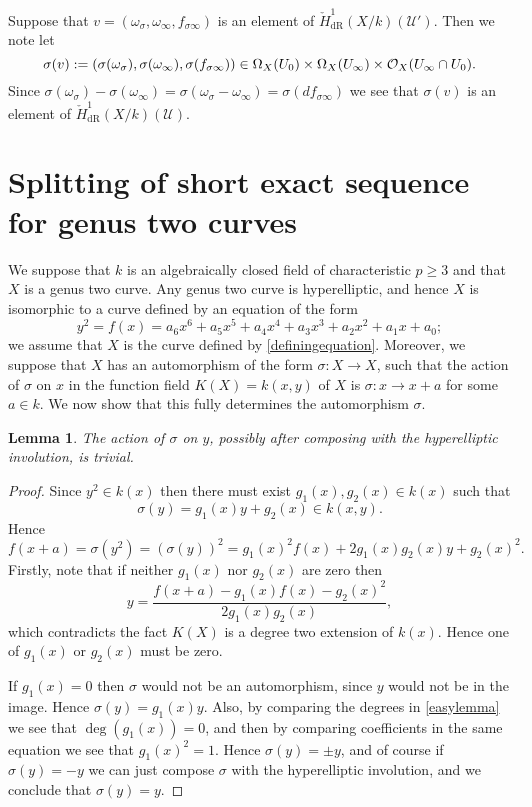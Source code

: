 \documentclass[draft, 11pt]{article} %
\theoremstyle{plain}
\newtheorem{lem}[defn]{Lemma}
\theoremstyle{remark}
\newcommand{\cO}{{\cal O}}
\newcommand{\ra}{\rightarrow}
\newcommand{\cU}{{\mathcal U}}
\newcommand{\cechderhamhone}{\check{H}_{\text {dR}}^1(X/k)}
\begin{document}
Suppose that $v = (\omega_\sigma , \omega_\infty, f_{\sigma \infty})$ is an element of $\cechderhamhone(\cU')$.
Then we note let
\begin{equation*}
\sigma(v) := (\sigma(\omega_\sigma), \sigma(\omega_\infty), \sigma(f_{\sigma \infty})) \in \Omega_X(U_0) \times \Omega_X(U_\infty) \times \cO_X(U_\infty \cap U_0).
\end{equation*}
Since $\sigma(\omega_\sigma)-\sigma(\omega_\infty) = \sigma(\omega_\sigma - \omega_\infty) = \sigma(df_{\sigma \infty})$ we see that $\sigma(v)$ is an element of $\cechderhamhone(\cU)$.



\section{Splitting of short exact sequence for genus two curves}

We suppose that $k$ is an algebraically closed field of characteristic $p \geq 3$ and that $X$ is a genus two curve.
Any genus two curve is hyperelliptic, and hence $X$ is isomorphic to a curve defined by an equation of the form
\begin{equation}\label{definingequation}
y^2 = f(x) = a_6x^6 + a_5x^5 + a_4x^4 + a_3x^3 + a_2x^2 + a_1x + a_0;
\end{equation}
we assume that $X$ is the curve defined by \eqref{definingequation}.
Moreover, we suppose that $X$ has an automorphism of the form $\sigma \colon X \ra X$, such that the action of $\sigma$ on $x$ in the function field $K(X) = k(x,y)$ of $X$ is $\sigma \colon x \to x+a$ for some $a\in k$.
We now show that this fully determines the automorphism $\sigma$.\todo{define $\sigma$ better - comment that it is a map $K(X) \ra K(X)$}

\begin{lem}
The action of $\sigma$ on $y$, possibly after composing with the hyperelliptic involution, is trivial.
\end{lem}
\begin{proof}
Since $y^2 \in k(x)$ then there must exist $g_1(x), g_2(x) \in k(x)$ such that 
\begin{equation*}
\sigma(y) = g_1(x)y + g_2(x) \in k(x,y).
\end{equation*}
Hence
\begin{equation}\label{easylemma}
f(x+a) = \sigma(y^2) = (\sigma(y))^2 = g_1(x)^2f(x)+2g_1(x)g_2(x)y + g_2(x)^2.
\end{equation}
Firstly, note that if neither $g_1(x)$ nor $g_2(x)$ are zero then
\[
y = \frac{f(x+a) - g_1(x)f(x) - g_2(x)^2}{2g_1(x)g_2(x)},
\]
which contradicts the fact $K(X)$ is a degree two extension of $k(x)$.
Hence one of $g_1(x)$ or $g_2(x)$ must be zero.

If $g_1(x) = 0$ then $\sigma$ would not be an automorphism, since $y$ would not be in the image.
Hence $\sigma(y) = g_1(x)y$.
Also, by comparing the degrees in \eqref{easylemma} we see that $\deg(g_1(x)) = 0$, and then by comparing coefficients in the same equation we see that $g_1(x)^2 = 1$.
Hence $\sigma(y) = \pm y$, and of course if $\sigma(y) = -y$ we can just compose $\sigma$ with the hyperelliptic involution, and we conclude that $\sigma(y) = y$.
\end{proof}
\end{document}
